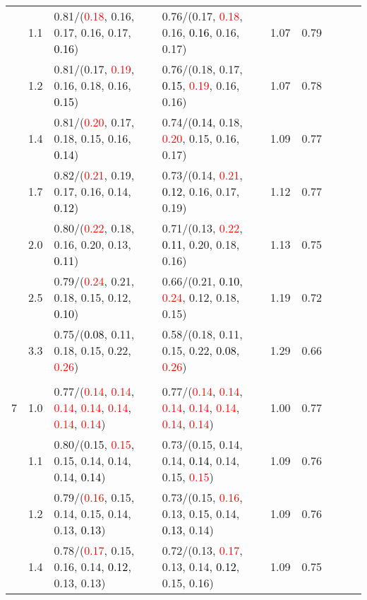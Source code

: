 \documentclass[10pt,a4paper]{report}
\begin{document}
\begin{table}[!htbp]
\begin{center}
{\begin{tabular}{ccllccccc}
			&1.1&0.81/(\textcolor{red}{0.18}, 0.16, 0.17, 0.16, 0.17, \textcolor{black}{0.16})&0.76/(0.17, \textcolor{red}{0.18}, 0.16, \textcolor{black}{0.16}, 0.16, 0.17)&1.07&0.79\\
			&1.2&0.81/(0.17, \textcolor{red}{0.19}, 0.16, 0.18, 0.16, \textcolor{black}{0.15})&0.76/(0.18, 0.17, \textcolor{black}{0.15}, \textcolor{red}{0.19}, 0.16, 0.16)&1.07&0.78\\
			&1.4&0.81/(\textcolor{red}{0.20}, 0.17, 0.18, 0.15, 0.16, \textcolor{black}{0.14})&0.74/(\textcolor{black}{0.14}, 0.18, \textcolor{red}{0.20}, 0.15, 0.16, 0.17)&1.09&0.77\\
			&1.7&0.82/(\textcolor{red}{0.21}, 0.19, 0.17, 0.16, 0.14, \textcolor{black}{0.12})&0.73/(0.14, \textcolor{red}{0.21}, \textcolor{black}{0.12}, 0.16, 0.17, 0.19)&1.12&0.77\\
			&2.0&0.80/(\textcolor{red}{0.22}, 0.18, 0.16, 0.20, 0.13, \textcolor{black}{0.11})&0.71/(0.13, \textcolor{red}{0.22}, \textcolor{black}{0.11}, 0.20, 0.18, 0.16)&1.13&0.75\\
			&2.5&0.79/(\textcolor{red}{0.24}, 0.21, 0.18, 0.15, 0.12, \textcolor{black}{0.10})&0.66/(0.21, \textcolor{black}{0.10}, \textcolor{red}{0.24}, 0.12, 0.18, 0.15)&1.19&0.72\\
			&3.3&0.75/(\textcolor{black}{0.08}, 0.11, 0.18, 0.15, 0.22, \textcolor{red}{0.26})&0.58/(0.18, 0.11, 0.15, 0.22, \textcolor{black}{0.08}, \textcolor{red}{0.26})&1.29&0.66\\
			&&&&\\
			7			&1.0&0.77/(\textcolor{red}{0.14}, \textcolor{red}{0.14}, \textcolor{red}{0.14}, \textcolor{red}{0.14}, \textcolor{red}{0.14}, \textcolor{red}{0.14}, \textcolor{red}{0.14})&0.77/(\textcolor{red}{0.14}, \textcolor{red}{0.14}, \textcolor{red}{0.14}, \textcolor{red}{0.14}, \textcolor{red}{0.14}, \textcolor{red}{0.14}, \textcolor{red}{0.14})&1.00&0.77\\
			&1.1&0.80/(0.15, \textcolor{red}{0.15}, 0.15, 0.14, 0.14, 0.14, \textcolor{black}{0.14})&0.73/(0.15, 0.14, 0.14, \textcolor{black}{0.14}, 0.14, 0.15, \textcolor{red}{0.15})&1.09&0.76\\
			&1.2&0.79/(\textcolor{red}{0.16}, 0.15, 0.14, 0.15, 0.14, 0.13, \textcolor{black}{0.13})&0.73/(0.15, \textcolor{red}{0.16}, 0.13, 0.15, 0.14, \textcolor{black}{0.13}, 0.14)&1.09&0.76\\
			&1.4&0.78/(\textcolor{red}{0.17}, 0.15, 0.16, 0.14, \textcolor{black}{0.12}, 0.13, 0.13)&0.72/(0.13, \textcolor{red}{0.17}, 0.13, 0.14, \textcolor{black}{0.12}, 0.15, 0.16)&1.09&0.75\\

\end{tabular}}
\end{center}
\end{table}
\end{document}
